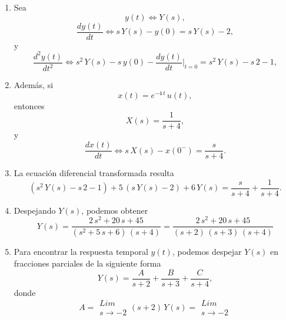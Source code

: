 \begin{enumerate}
	\item Sea \begin{equation}y(t) \Leftrightarrow Y(s),\end{equation}
	\begin{equation}\frac{dy(t)}{dt} \Leftrightarrow s \, Y(s) - y(0) =
	s \, Y(s) - 2,\end{equation}
	y \begin{equation}
		\frac{d^{2}y(t)}{dt^{2}} \Leftrightarrow s^{2} \, Y(s) - s \, y(0) - \frac{dy(t)}{dt}|_{t=0} = s^{2} \, Y(s) - s \, 2 - 1,
	\end{equation}
	\item Además, si \begin{equation}x(t) = e^{-4 \, t} \, u(t),\end{equation} entonces \begin{equation}X(s) = \frac{1}{s + 4},\end{equation}
	y \begin{equation}\frac{dx(t)}{dt} \Leftrightarrow s \, X(s) - x(0^{-}) = \frac{s}{s+4}.\end{equation} 
	\item La ecuación diferencial transformada resulta
	\begin{equation}
		(s^{2} \, Y(s) - s \, 2 - 1) + 5 \, (s \, Y(s) - 2) + 6 \, Y(s) = 
		\frac{s}{s+4} + \frac{1}{s+4}.
	\end{equation}
	\item Despejando $Y(s)$, podemos obtener
	\begin{equation}
		Y(s) = \frac{2 \, s^{2} + 20 \, s + 45}{(s^{2} + 5 \, s + 6) \, (s + 4)} = 
		\frac{2 \, s^{2} + 20 \, s + 45}{(s + 2) \, (s + 3) \, (s + 4)}
	\end{equation}
    \item Para encontrar la respuesta temporal $y(t)$, podemos despejar $Y(s)$ en fracciones parciales de la siguiente forma
    \begin{equation}
    	Y(s) = \frac{A}{s+2} + \frac{B}{s+3} + \frac{C}{s+4},
    \end{equation}
    donde
    \begin{equation}
    	A = \begin{array}{c}
    		Lim \\
    		s \rightarrow -2
    	\end{array}
        (s + 2) \, Y(s) = 
    	\begin{array}{c}
	Lim \\
	s \rightarrow -2

\end{array}
\end{equation}
\end{enumerate}
